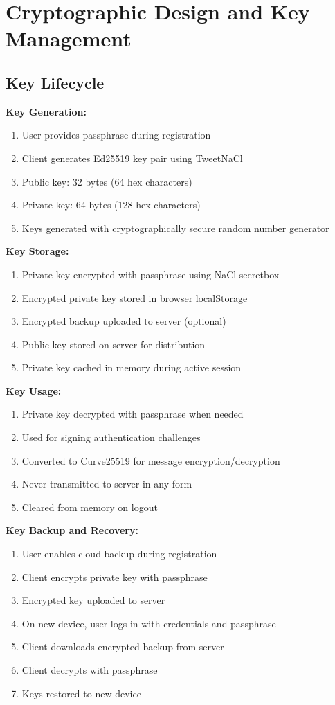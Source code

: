 \section{Cryptographic Design and Key Management}

\subsection{Key Lifecycle}

\textbf{Key Generation:}
\begin{enumerate}
    \item User provides passphrase during registration
    \item Client generates Ed25519 key pair using TweetNaCl
    \item Public key: 32 bytes (64 hex characters)
    \item Private key: 64 bytes (128 hex characters)
    \item Keys generated with cryptographically secure random number generator
\end{enumerate}

\textbf{Key Storage:}
\begin{enumerate}
    \item Private key encrypted with passphrase using NaCl secretbox
    \item Encrypted private key stored in browser localStorage
    \item Encrypted backup uploaded to server (optional)
    \item Public key stored on server for distribution
    \item Private key cached in memory during active session
\end{enumerate}

\textbf{Key Usage:}
\begin{enumerate}
    \item Private key decrypted with passphrase when needed
    \item Used for signing authentication challenges
    \item Converted to Curve25519 for message encryption/decryption
    \item Never transmitted to server in any form
    \item Cleared from memory on logout
\end{enumerate}

\textbf{Key Backup and Recovery:}
\begin{enumerate}
    \item User enables cloud backup during registration
    \item Client encrypts private key with passphrase
    \item Encrypted key uploaded to server
    \item On new device, user logs in with credentials and passphrase
    \item Client downloads encrypted backup from server
    \item Client decrypts with passphrase
    \item Keys restored to new device
\end{enumerate}

